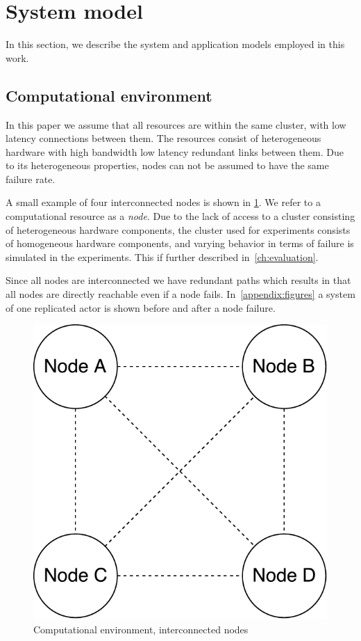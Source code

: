 \documentclass{cslthse-msc}
\begin{document}
\section{System model} \label{sec:design_system_model}
In this section, we describe the system and application models employed in this work.

\subsection{Computational environment} \label{subsec:design_comp_env}
In this paper we assume that all resources are within the same cluster, with low latency connections between them. The resources consist of heterogeneous hardware with high bandwidth low latency redundant links between them. Due to its heterogeneous properties, nodes can not be assumed to have the same failure rate.

A small example of four interconnected nodes  is shown in \cref{fig:computational_environment}. We refer to a computational resource as a \emph{node}. Due to the lack of access to a cluster consisting of heterogeneous hardware components, the cluster used for experiments consists of homogeneous hardware components, and varying behavior in terms of failure is simulated in the experiments. This if further described in~\cref{ch:evaluation}.

Since all nodes are interconnected we have redundant paths which results in that all nodes are directly reachable even if a node fails. In~\cref{appendix:figures} a system of one replicated actor is shown before and after a node failure.

\begin{figure}[!hbt]
\centering
\includegraphics[scale=0.5]{images/computational_environment.pdf}
\caption{Computational environment, interconnected nodes} \label{fig:computational_environment}
\end{figure}
\end{document}
